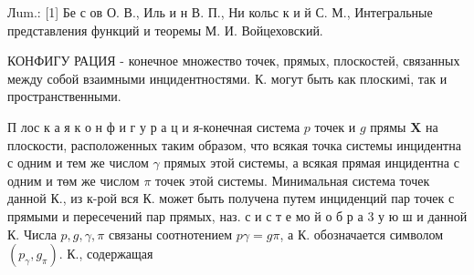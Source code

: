 \documentclass[10pt]{article}
\begin{document}
Лum.: [1] Бе с ов О. В., Иль и н В. П., Ни кольс к и й С. М., Интегральные представления функций и теоремы М. И. Войцеховский.

КОНФИГУ РАЦИЯ - конечное множество точек, прямых, плоскостей, связанных между собой взаимными инцидентностями. К. могут быть как плоскимі, так и пространственными.



П лос к а я к о н ф и г у р а ц и я-конечная система $p$ точек и $g$ прямы $\mathbf{X}$ на плоскости, расположенных таким образом, что всякая точка системы инцидентна с одним и тем же числом $\gamma$ прямых этой системы, а всякая прямая инцидентна с одним и төм же числом $\pi$ точек этой системы. Минимальная система точек данной $К .$, из к-рой вся $К$. может быть получена путем инциденций пар точек с прямыми и пересечений пар прямых, наз. с и с т е мо й о б р а 3 у ю ш и данной К. Числа $p, g, \gamma, \pi$ связаны соотнотением $p \gamma=g \pi$, а К. обозначается символом $\left(p_{\gamma}, g_{\pi}\right)$. К., содержащая
\end{document}
